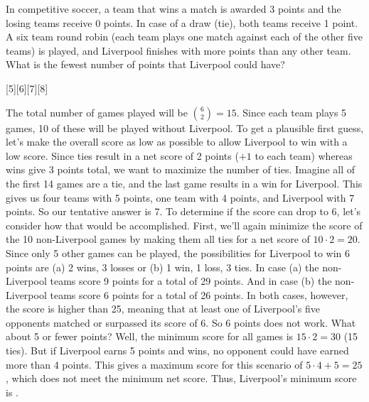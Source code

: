 \documentclass[12pt]{article}
\newcounter{problem}
\begin{document}
\begin{problem}
   In competitive soccer, a team that wins a match is awarded 3 points and the losing teams receive 0 points. In case of a draw (tie), both teams receive 1 point. A six team round robin (each team plays one match against each of the other five teams) is played, and Liverpool finishes with more points than any other team. What is the fewest number of points that Liverpool could have?
\end{problem}
[5][6][7][8]
\begin{solution}[D]
   The total number of games played will be $\binom{6}{2}=15$. Since each team plays 5 games, 10 of these will be played without Liverpool. To get a plausible first guess, let's make the overall score as low as possible to allow Liverpool to win with a low score. Since ties result in a net score of 2 points ($+1$ to each team) whereas wins give 3 points total, we want to maximize the number of ties. \medbreak
        Imagine all of the first 14 games are a tie, and the last game results in a win for Liverpool. This gives us four teams with 5 points, one team with 4 points, and Liverpool with 7 points. So our tentative answer is 7. To determine if the score can drop to 6, let's consider how that would be accomplished. \medbreak
        First, we'll again minimize the score of the 10 non-Liverpool games by making them all ties for a net score of $10\cdot2=20$. Since only 5 other games can be played, the possibilities for Liverpool to win 6 points are (a) 2 wins, 3 losses or (b) 1 win, 1 loss, 3 ties. In case (a) the non-Liverpool teams score 9 points for a total of 29 points. And in case (b) the non-Liverpool teams score 6 points for a total of 26 points. In both cases, however, the score is higher than 25, meaning that at least one of Liverpool's five opponents matched or surpassed its score of 6. So 6 points does not work.\medbreak
        What about 5 or fewer points? Well, the minimum score for all games is $15\cdot2=30$ (15 ties). But if Liverpool earns 5 points and wins, no opponent could have earned more than 4 points. This gives a maximum score for this scenario of $5\cdot4+5=25$, which does not meet the minimum net score. Thus, Liverpool's minimum score is .
\end{solution}
\end{document}
